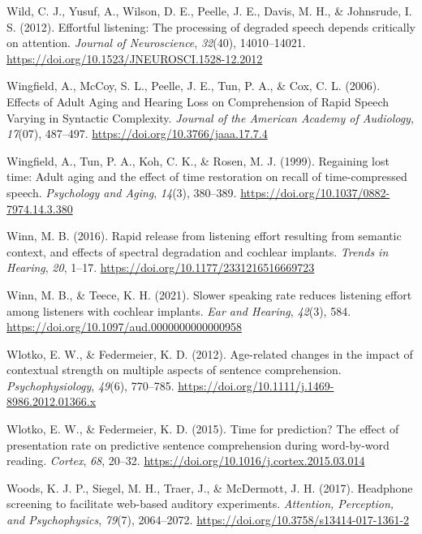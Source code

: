 \documentclass[a4paper, nobind]{templates/ociamthesis}
\newlength{\cslhangindent}
\newenvironment{CSLReferences}[2] %
 {%
  \setlength{\parindent}{0pt}
  \ifodd #1
  \let\oldpar\par
  \def\par{\hangindent=\cslhangindent\oldpar}
  \fi
  \setlength{\parskip}{1mm}
  \setlength{\baselineskip}{6mm}
 }%
 {}
\begin{document}
\begin{CSLReferences}{1}{0}
\leavevmode{}%
Wild, C. J., Yusuf, A., Wilson, D. E., Peelle, J. E., Davis, M. H., \& Johnsrude, I. S. (2012). {Effortful listening: The processing of degraded speech depends critically on attention}. \emph{Journal of Neuroscience}, \emph{32}(40), 14010--14021. \url{https://doi.org/10.1523/JNEUROSCI.1528-12.2012}

\leavevmode{}%
Wingfield, A., McCoy, S. L., Peelle, J. E., Tun, P. A., \& Cox, C. L. (2006). Effects of Adult Aging and Hearing Loss on Comprehension of Rapid Speech Varying in Syntactic Complexity. \emph{Journal of the American Academy of Audiology}, \emph{17}(07), 487--497. \url{https://doi.org/10.3766/jaaa.17.7.4}

\leavevmode{}%
Wingfield, A., Tun, P. A., Koh, C. K., \& Rosen, M. J. (1999). {Regaining lost time: Adult aging and the effect of time restoration on recall of time-compressed speech}. \emph{Psychology and Aging}, \emph{14}(3), 380--389. \url{https://doi.org/10.1037/0882-7974.14.3.380}

\leavevmode{}%
Winn, M. B. (2016). Rapid release from listening effort resulting from semantic context, and effects of spectral degradation and cochlear implants. \emph{Trends in Hearing}, \emph{20}, 1--17. \url{https://doi.org/10.1177/2331216516669723}

\leavevmode{}%
Winn, M. B., \& Teece, K. H. (2021). {Slower speaking rate reduces listening effort among listeners with cochlear implants}. \emph{Ear and Hearing}, \emph{42}(3), 584. \url{https://doi.org/10.1097/aud.0000000000000958}

\leavevmode{}%
Wlotko, E. W., \& Federmeier, K. D. (2012). Age-related changes in the impact of contextual strength on multiple aspects of sentence comprehension. \emph{Psychophysiology}, \emph{49}(6), 770--785. \url{https://doi.org/10.1111/j.1469-8986.2012.01366.x}

\leavevmode{}%
Wlotko, E. W., \& Federmeier, K. D. (2015). {Time for prediction? The effect of presentation rate on predictive sentence comprehension during word-by-word reading}. \emph{Cortex}, \emph{68}, 20--32. \url{https://doi.org/10.1016/j.cortex.2015.03.014}

\leavevmode{}%
Woods, K. J. P., Siegel, M. H., Traer, J., \& McDermott, J. H. (2017). {Headphone screening to facilitate web-based auditory experiments}. \emph{Attention, Perception, and Psychophysics}, \emph{79}(7), 2064--2072. \url{https://doi.org/10.3758/s13414-017-1361-2}


\end{CSLReferences}
\end{document}
